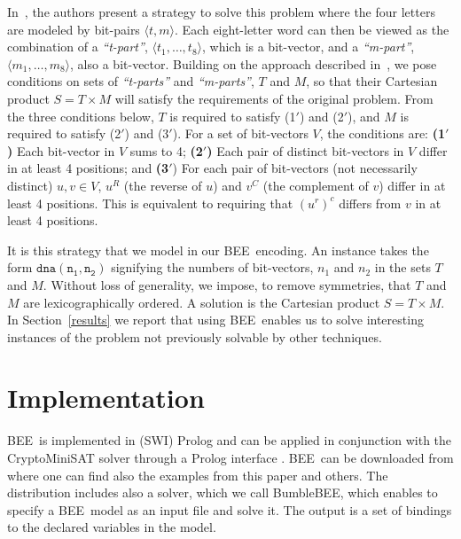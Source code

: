 \documentclass{tlp}
\newcommand\tuple[1]{\langle #1 \rangle}
\newcommand{\bee}{\textsf{BEE}}
\begin{document}
In~\cite{dnaWordPaper}, the authors present a strategy to solve this
problem where the four letters are modeled by bit-pairs
$\tuple{t,m}$. Each eight-letter word can then be viewed as the
combination of a \emph{``t-part''}, $\tuple{t_1,\ldots,t_8}$, which is
a bit-vector, and a \emph{``m-part''}, $\tuple{m_1,\ldots,m_8}$, also
a bit-vector. Building on the approach described
in~\cite{dnaWordPaper}, we pose conditions on sets of
\emph{``t-parts''} and \emph{``m-parts''}, $T$ and $M$, so that their
Cartesian product $S=T\times M$ will satisfy the requirements of the
original problem. From the three conditions below, $T$ is required to
satisfy (1$'$) and (2$'$), and $M$ is required to satisfy (2$'$) and
(3$'$).
For a set of bit-vectors $V$, the conditions are:
\textbf{(1$'$)} Each bit-vector in $V$ sums to 4;
\textbf{(2$'$)} Each pair of distinct bit-vectors in $V$ differ in at
  least 4 positions; and
\textbf{(3$'$}) For each pair of bit-vectors (not necessarily distinct)
  $u,v\in V$, $u^R$ (the reverse of $u$) and $v^C$ (the complement of
  $v$) differ in at least 4 positions. This is equivalent to requiring
  that $(u^r)^c$ differs from $v$ in at least 4 positions.


  It is this strategy that we model in our \bee\ encoding.
  An instance takes the form $\mathtt{dna(n_1,n_2)}$ signifying the
  numbers of bit-vectors, $n_1$ and $n_2$ in the sets $T$ and $M$.
Without loss of generality, we impose, to remove symmetries, that
  $T$ and $M$ are lexicographically ordered.
A solution is the Cartesian product $S=T\times M$.
In Section~\ref{results} we report that using \bee\ enables us to
  solve interesting instances of the problem not previously solvable
  by other techniques.













\section{Implementation}
\label{sec:implementation}

\bee\ is implemented in (SWI) Prolog and can be applied in conjunction
with the CryptoMiniSAT solver \cite{Crypto} through a Prolog interface
\cite{satPearl}. \bee\ can be downloaded from \cite{bee2012} where one
can find also the examples from this paper and others. The
distribution includes also a solver, which we call Bumble\bee, which
enables to specify a \bee\ model as an input file and solve it. The
output is a set of bindings to the declared variables in the model.
\end{document}
